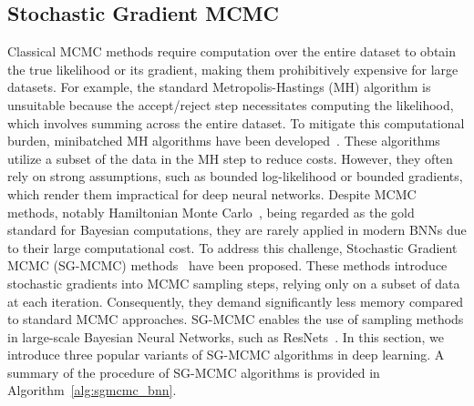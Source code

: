 \subsection{Stochastic Gradient MCMC}
\label{sec:bnn_sgmcmc}
Classical MCMC methods require computation over the entire dataset to obtain the true likelihood or its gradient, making them prohibitively expensive for large datasets. For example, the standard Metropolis-Hastings (MH) algorithm is unsuitable because the accept/reject step necessitates computing the likelihood, which involves summing across the entire dataset. To mitigate this computational burden, minibatched MH algorithms have been developed~\cite{korattikara2014austerity,maclaurin2014firefly,quiroz2018speeding,zhang2020asymptotically}. These algorithms utilize a subset of the data in the MH step to reduce costs. However, they often rely on strong assumptions, such as bounded log-likelihood or bounded gradients, which render them impractical for deep neural networks. 
Despite MCMC methods, notably Hamiltonian Monte Carlo~\citep{duane1987hybrid,neal2010mcmc}, being regarded as the gold standard for Bayesian computations, they are rarely applied in modern BNNs due to their large computational cost. To address this challenge, Stochastic Gradient MCMC (SG-MCMC) methods~\citep{welling2011bayesian,chen2014stochastic,ma2015complete,zhangcyclical} have been proposed. These methods introduce stochastic gradients into MCMC sampling steps, relying only on a subset of data at each iteration. Consequently, they demand significantly less memory compared to standard MCMC approaches. SG-MCMC enables the use of sampling methods in large-scale Bayesian Neural Networks, such as ResNets~\citep{he:resnet2016}. In this section, we introduce three popular variants of SG-MCMC algorithms in deep learning. A summary of the procedure of SG-MCMC algorithms is provided in Algorithm~\ref{alg:sgmcmc_bnn}. 


\vspace{-1em}
